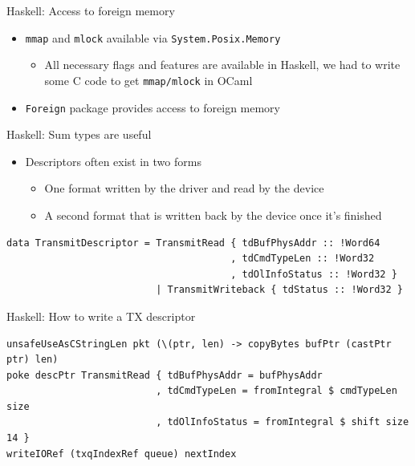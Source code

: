 \documentclass[NET,english,aspectratio=169,notitleframe]{tumbeamer}
\begin{document}
\begin{frame}{Haskell: Access to foreign memory}
\begin{itemize}
\item \texttt{mmap} and \texttt{mlock} available via \texttt{System.Posix.Memory}
\begin{itemize}
\item All necessary flags and features are available in Haskell, we had to write some C code to get \texttt{mmap/mlock} in OCaml
\end{itemize}
\vspace{1em}
\item \texttt{Foreign} package provides access to foreign memory
\end{itemize}
\end{frame}


\begin{frame}[fragile]{Haskell: Sum types are useful}
\begin{itemize}
\item Descriptors often exist in two forms
\begin{itemize}
\item One format written by the driver and read by the device
\item A second format that is written back by the device once it's finished
\end{itemize}
\end{itemize}
\begin{verbatim}
data TransmitDescriptor = TransmitRead { tdBufPhysAddr :: !Word64
                                       , tdCmdTypeLen :: !Word32
                                       , tdOlInfoStatus :: !Word32 }
                          | TransmitWriteback { tdStatus :: !Word32 }
\end{verbatim}
\end{frame}


\begin{frame}[fragile]{Haskell: How to write a TX descriptor}
\begin{verbatim}
unsafeUseAsCStringLen pkt (\(ptr, len) -> copyBytes bufPtr (castPtr ptr) len)
poke descPtr TransmitRead { tdBufPhysAddr = bufPhysAddr 
                          , tdCmdTypeLen = fromIntegral $ cmdTypeLen size
                          , tdOlInfoStatus = fromIntegral $ shift size 14 }
writeIORef (txqIndexRef queue) nextIndex
\end{verbatim}
\end{frame}
\end{document}
